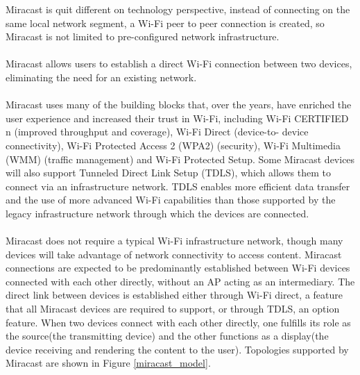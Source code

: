 Miracast \cite{miracast_industry} is quit different on technology perspective, 
instead of connecting on the same local network segment, a Wi-Fi peer to peer 
connection is created, so Miracast is not limited to pre-configured network infrastructure. \\
\\
Miracast allows users to establish a direct Wi-Fi connection between two 
devices, eliminating the need for an existing network. \\
\\
Miracast uses many of the building blocks that, over the years, have enriched 
the user experience and increased their trust in Wi-Fi, including Wi-Fi 
CERTIFIED n (improved throughput and coverage), Wi-Fi Direct (device-to- 
device connectivity), Wi-Fi Protected Access 2 (WPA2) (security), Wi-Fi 
Multimedia (WMM) (traffic management) and Wi-Fi Protected Setup. Some 
Miracast devices will also support Tunneled Direct Link Setup (TDLS), which 
allows them to connect via an infrastructure network. TDLS enables more 
efficient data transfer and the use of more advanced Wi-Fi capabilities than 
those supported by the legacy infrastructure network through which the devices 
are connected. \\
\\
Miracast does not require a typical Wi-Fi infrastructure network, though many 
devices will take advantage of network connectivity to access content. Miracast 
connections are expected to be predominantly established between Wi-Fi devices 
connected with each other directly, without an AP acting as an intermediary. 
The direct link between devices is established either through Wi-Fi direct, a 
feature that all Miracast devices are required to support, or through TDLS, an 
option feature. When two devices connect with each other directly, one fulfills 
its role as the source(the transmitting device) and the other functions as a 
display(the device receiving and rendering the content to the user). Topologies 
supported by Miracast are shown in Figure \ref{miracast_model}. 

